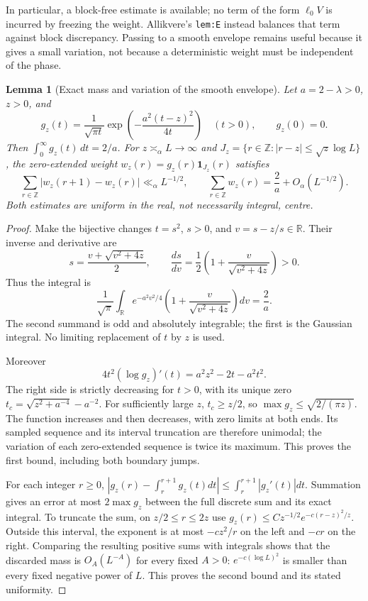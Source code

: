 \documentclass[11pt]{article}
\newtheorem{lemma}[proposition]{Lemma}
\theoremstyle{remark}\newtheorem{remark}[proposition]{Remark}
\newcommand{\ZZ}{\mathbb Z}
\newcommand{\one}{\mathbf 1}
\begin{document}
In particular, a block-free estimate is available; no term of the form
$\ell_0 V$ is incurred by freezing the weight. Allikvere's
\texttt{lem:E} instead balances that term against block discrepancy.
Passing to a smooth envelope remains useful because it gives a small
variation, not because a deterministic weight must be independent of
the phase.

\begin{lemma}[Exact mass and variation of the smooth envelope]
\label{lem:envelope-mass}
Let $a=2-\lambda>0$, $z>0$, and
\[
 g_z(t)=\frac{1}{\sqrt{\pi t}}
        \exp\left(-\frac{a^2(t-z)^2}{4t}\right)\quad(t>0),
 \qquad g_z(0)=0.
\]
Then $\int_0^\infty g_z(t)\,dt=2/a$.
For $z\asymp_\alpha L\to\infty$ and
$J_z=\{r\in\ZZ:|r-z|\le\sqrt z\log L\}$, the zero-extended weight
$w_z(r)=g_z(r)\one_{J_z}(r)$ satisfies
\[
 \sum_{r\in\ZZ}|w_z(r+1)-w_z(r)|\ll_\alpha L^{-1/2},
 \qquad
 \sum_{r\in\ZZ}w_z(r)=\frac2a+O_\alpha(L^{-1/2}).
\]
Both estimates are uniform in the real, not necessarily integral, centre.
\end{lemma}
\begin{proof}
Make the bijective changes $t=s^2$, $s>0$, and
$v=s-z/s\in\mathbb R$. Their inverse and derivative are
\[
 s=\frac{v+\sqrt{v^2+4z}}2,
 \qquad\frac{ds}{dv}=\frac12
     \left(1+\frac{v}{\sqrt{v^2+4z}}\right)>0.
\]
Thus the integral is
\[
 \frac1{\sqrt\pi}\int_{\mathbb R}e^{-a^2v^2/4}
       \left(1+\frac{v}{\sqrt{v^2+4z}}\right)dv
 =\frac2a.
\]
The second summand is odd and absolutely integrable; the first is
the Gaussian integral. No limiting replacement of $t$ by $z$ is used.

Moreover
\[
 4t^2(\log g_z)'(t)=a^2z^2-2t-a^2t^2.
\]
The right side is strictly decreasing for $t>0$, with its unique zero
$t_c=\sqrt{z^2+a^{-4}}-a^{-2}$. For sufficiently large $z$,
$t_c\ge z/2$, so $\max g_z\le\sqrt{2/(\pi z)}$.
The function increases and then decreases, with zero limits at both
ends. Its sampled sequence and its interval truncation are therefore
unimodal; the variation of each zero-extended sequence is twice its
maximum. This proves the first bound, including both boundary jumps.

For each integer $r\ge0$,
$|g_z(r)-\int_r^{r+1}g_z(t)dt|\le\int_r^{r+1}|g_z'(t)|dt$.
Summation gives an error at most $2\max g_z$ between the full discrete
sum and its exact integral. To truncate the sum, on $z/2\le r\le2z$
use $g_z(r)\le C z^{-1/2}e^{-c(r-z)^2/z}$. Outside this interval,
the exponent is at most $-c z^2/r$ on the left and $-cr$ on the right.
Comparing the resulting positive sums with integrals shows that the
discarded mass is $O_A(L^{-A})$ for every fixed $A>0$:
$e^{-c(\log L)^2}$ is smaller than every fixed negative power of $L$.
This proves the second bound and its stated uniformity.
\end{proof}
\end{document}
